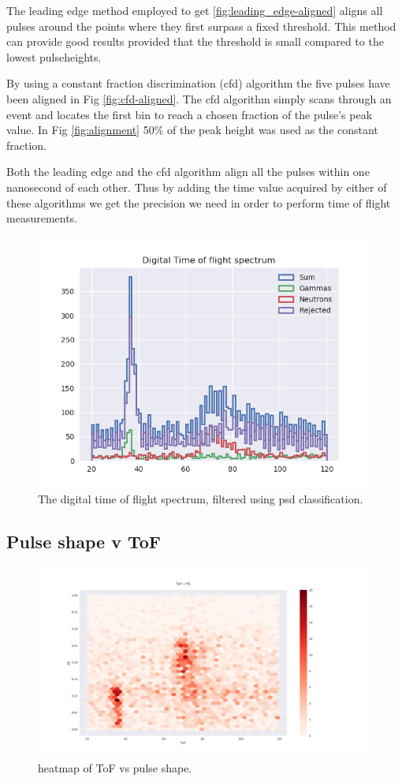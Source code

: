 \documentclass[main.tex]{subfiles}
\begin{document}
The leading edge method employed to get \ref{fig:leading_edge-aligned} aligns all pulses around the points where they first surpass a fixed threshold. This method can provide good results provided that the threshold is small compared to the lowest pulseheights. 

By using a constant fraction discrimination (cfd) algorithm the five pulses have been aligned in Fig \ref{fig:cfd-aligned}. The cfd algorithm simply scans through an event and locates the first bin to reach a chosen fraction of the pulse's peak value. In Fig \ref{fig:alignment} 50\% of the peak height was used as the constant fraction. 

Both the leading edge and the cfd algorithm align all the pulses within one nanosecond of each other. Thus by adding the time value acquired by either of these algorithms we get the precision we need in order to perform time of flight measurements.

\begin{figure}[ht]
    \centering
        \includegraphics[scale=.75]{DigitalResults/tof_psd.png}
        \caption{The digital time of flight spectrum, filtered using psd classification.}
    \label{fig:D_PSD_TOF} 
\end{figure}

\subsection{Pulse shape v ToF}
\begin{figure}[ht]
    \centering
        \includegraphics[scale=.35]{DigitalResults/tof_ps_d.png}
        \caption{heatmap of ToF vs pulse shape.}
    \label{fig:tof_ps_d} 
\end{figure}
\end{document}
